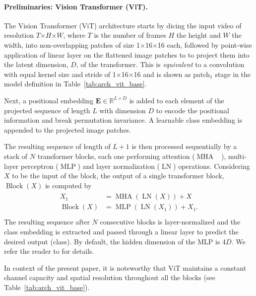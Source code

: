 \documentclass[10pt,twocolumn,letterpaper]{article}
\newcommand{\tblref}[1]{Table~\ref{#1}}
\def\x{$\times$}
\begin{document}
\paragraph{Preliminaries: Vision Transformer (ViT).}
The Vision Transformer (ViT) architecture \cite{dosovitskiy2020image} starts by dicing the input video of resolution $T$\x$H$\x$W$, where $T$ is the number of frames $H$ the height and $W$ the width, into non-overlapping patches of size 1\x16\x16 each, followed by point-wise application of linear layer on the flattened image patches to to project them into the latent dimension, $D$, of the transformer. This is \textit{equivalent} to a convolution with equal kernel size and stride of  1\x16\x16 and is shown as patch$_1$ stage in the model definition in \tblref{tab:arch_vit_base}.

Next, a positional embedding $\mathbf{E} \in \mathbb{R}^{L \times D}$ is added to each element of the projected sequence of length $L$ with  dimension $D$ to encode the positional information and break permutation invariance. A learnable class embedding is appended to the projected image patches. 

The resulting  sequence of  length of $L+1$ is then processed sequentially by a stack of $N$ transformer blocks, each one performing attention ($\operatorname{MHA}$~ \cite{vaswani2017attention}), multi-layer perceptron ($\operatorname{MLP}$) and layer normalization ($\operatorname{LN}$\cite{Ba2016}) operations. Considering $X$ to be the input of the block, the output of a single transformer block, $\operatorname{Block}(X)$ is computed by
\begin{align*}
	\begin{split}
		X_1 &= \operatorname{MHA}(\operatorname{LN}(X)) + X \\
		\operatorname{Block}(X) &= \operatorname{MLP}(\operatorname{LN}(X_1)) + X_1. \\     
	\end{split}
\end{align*}
The resulting sequence after $N$ consecutive blocks is layer-normalized and the class embedding is extracted and passed through a linear layer to predict the desired output (\eg class). By default, the hidden dimension of the MLP is 4$D$. We refer the reader to\cite{dosovitskiy2020image, vaswani2017attention} for details.

In context of the present paper, it is noteworthy that ViT maintains a constant channel capacity and spatial resolution throughout all the blocks (see \tblref{tab:arch_vit_base}).
\end{document}
